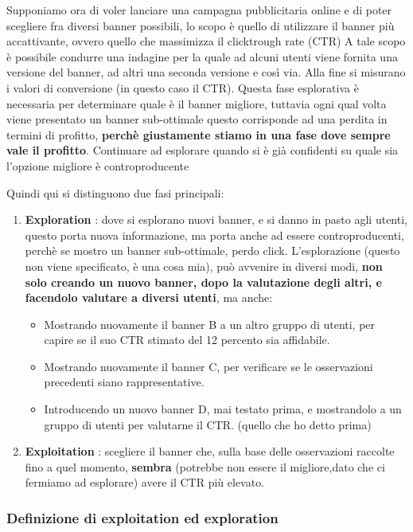 Supponiamo ora di voler lanciare una campagna pubblicitaria online e di poter scegliere fra diversi banner possibili, lo scopo è quello di utilizzare il banner più accattivante, ovvero quello che massimizza il clicktrough rate (CTR)
A tale scopo è possibile condurre una indagine per la 
quale ad alcuni utenti viene fornita una versione del 
banner, ad altri  una seconda versione e così via. Alla 
fine si misurano i valori di conversione  (in questo caso 
il CTR).
Questa fase esplorativa è necessaria per determinare 
quale è il banner migliore, tuttavia ogni qual volta 
viene presentato un banner sub-ottimale questo 
corrisponde ad una perdita in termini di profitto, \textbf{perchè giustamente stiamo in una fase dove sempre vale il profitto}.
Continuare ad esplorare quando si è già confidenti su 
quale sia l’opzione migliore è controproducente 


Quindi qui si distinguono due fasi principali:
\begin{enumerate}
    \item \textbf{Exploration} : dove si esplorano nuovi banner, e si danno in pasto agli utenti, questo porta nuova informazione, ma porta anche ad essere controproducenti, perchè se mostro un banner sub-ottimale, perdo click.
    L'esplorazione (questo non viene specificato, è una cosa mia), può avvenire in diversi modi, \textbf{non solo creando un nuovo banner, dopo la valutazione degli altri, e facendolo valutare a diversi utenti}, ma anche:
    \begin{itemize}
        \item Mostrando nuovamente il banner B a un altro gruppo di utenti, per capire se il suo CTR stimato del 12 percento sia affidabile.
        \item Mostrando nuovamente il banner C, per verificare se le osservazioni precedenti siano rappresentative.
        \item Introducendo un nuovo banner D, mai testato prima, e mostrandolo a un gruppo di utenti per valutarne il CTR. (quello che ho detto prima)
    \end{itemize}
    \item \textbf{Exploitation} : scegliere il banner che, sulla base delle osservazioni raccolte fino a quel momento, \textbf{sembra} (potrebbe non essere il migliore,dato che ci fermiamo ad esplorare) avere il CTR più elevato.
\end{enumerate}

\subsubsection{Definizione di exploitation ed exploration}

